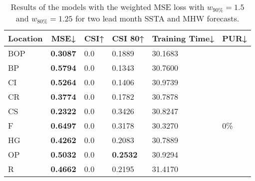 \documentclass[11pt, a4paper]{article}
\begin{document}
\begin{table}[H]
\centering
\small
\caption{Results of the models with the weighted MSE loss with $w_{90\%}=1.5$ and $w_{80\%}=1.25$ for two lead month SSTA and MHW forecasts.}
\begin{tabular}{llllll}
\multicolumn{1}{c}{\textbf{Location}} & \multicolumn{1}{c}{\textbf{MSE↓}} & \multicolumn{1}{c}{\textbf{CSI↑}} & \multicolumn{1}{c}{\textbf{CSI 80↑}} & \multicolumn{1}{c}{\textbf{Training Time↓}} & \multicolumn{1}{c}{\textbf{PUR↓}} \\ \hline
BOP                         & \textbf{0.3087}                   & 0.0                               & 0.1889                               & 30.1683                            &                          \\
BP                        & \textbf{0.5794}                   & 0.0                               & 0.1343                               & 30.7600                            &                          \\
CI                        & \textbf{0.5264}                   & 0.0                               & 0.1406                               & 30.9739                            &                          \\
CR                           & \textbf{0.3774}                   & 0.0                               & 0.1782                               & 30.7878                            &                          \\
CS                           & \textbf{0.2322}                   & 0.0                               & 0.3426                               & 30.8247                            &                          \\
F                             & \textbf{0.6497}                   & 0.0                               & 0.3178                               & 30.3270                            & 0\%                      \\
HG                          & \textbf{0.4262}                   & 0.0                               & 0.2083                               & 30.7889                            &                          \\
OP                       & \textbf{0.5032}                   & 0.0                               & \textbf{0.2532}                      & 30.9294                            &                          \\
R                                & \textbf{0.4662}                   & 0.0                               & 0.2195                               & 31.4170                            &                          \\

\end{tabular}
\end{table}
\end{document}
